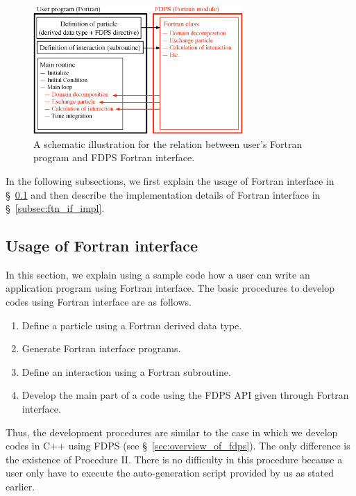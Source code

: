 \documentclass[proof,useamsfonts]{pasj01}
\begin{document}
\begin{figure}[h]
\begin{center}
\includegraphics[width=8cm]{figures/FTN_IF_UI}
\end{center}
\caption{A schematic illustration for the relation between user's Fortran program and FDPS Fortran interface.}
\label{fig:ftn_if_ui}  
\end{figure}

In the following subsections, we first explain the usage of Fortran interface in \S~\ref{subsec:ftn_if_usage} and then describe the implementation details of Fortran interface in \S~\ref{subsec:ftn_if_impl}.

\subsection{Usage of Fortran interface}
\label{subsec:ftn_if_usage}
In this section, we explain using a sample code how a user can write an application program using Fortran interface. The basic procedures to develop codes using Fortran interface are as follows.
\begin{enumerate}[label=\Roman*.]
\item Define a particle using a Fortran derived data type. 
\item Generate Fortran interface programs.
\item Define an interaction using a Fortran subroutine. 
\item Develop the main part of a code using the FDPS API given through Fortran interface. 
\end{enumerate}
Thus, the development procedures are similar to the case in which we develop codes in C++ using FDPS (see \S~\ref{sec:overview_of_fdps}). The only difference is the existence of Procedure II. There is no difficulty in this procedure because a user only have to execute the auto-generation script provided by us as stated earlier.
\end{document}
